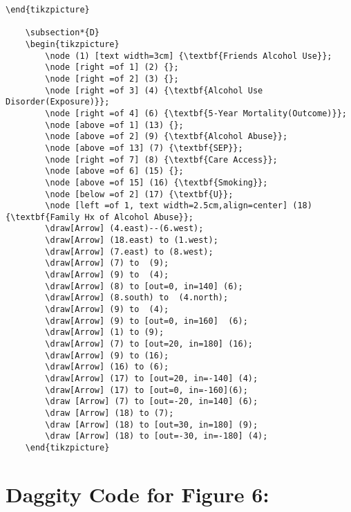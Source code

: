 \documentclass{article}
\begin{document}
\begin{lstlisting}[frame=single, basicstyle=\ttfamily]
    \end{tikzpicture}
    
    \subsection*{D}
    \begin{tikzpicture}
        \node (1) [text width=3cm] {\textbf{Friends Alcohol Use}};
        \node [right =of 1] (2) {};
        \node [right =of 2] (3) {};
        \node [right =of 3] (4) {\textbf{Alcohol Use Disorder(Exposure)}};
        \node [right =of 4] (6) {\textbf{5-Year Mortality(Outcome)}};
        \node [above =of 1] (13) {};
        \node [above =of 2] (9) {\textbf{Alcohol Abuse}};
        \node [above =of 13] (7) {\textbf{SEP}};
        \node [right =of 7] (8) {\textbf{Care Access}};
        \node [above =of 6] (15) {};
        \node [above =of 15] (16) {\textbf{Smoking}};
        \node [below =of 2] (17) {\textbf{U}};
        \node [left =of 1, text width=2.5cm,align=center] (18) {\textbf{Family Hx of Alcohol Abuse}};
        \draw[Arrow] (4.east)--(6.west);
        \draw[Arrow] (18.east) to (1.west);
        \draw[Arrow] (7.east) to (8.west);
        \draw[Arrow] (7) to  (9);
        \draw[Arrow] (9) to  (4);
        \draw[Arrow] (8) to [out=0, in=140] (6);
        \draw[Arrow] (8.south) to  (4.north);
        \draw[Arrow] (9) to  (4);
        \draw[Arrow] (9) to [out=0, in=160]  (6);
        \draw[Arrow] (1) to (9);
        \draw[Arrow] (7) to [out=20, in=180] (16);
        \draw[Arrow] (9) to (16);
        \draw[Arrow] (16) to (6);
        \draw[Arrow] (17) to [out=20, in=-140] (4);
        \draw[Arrow] (17) to [out=0, in=-160](6);
        \draw [Arrow] (7) to [out=-20, in=140] (6);
        \draw [Arrow] (18) to (7);
        \draw [Arrow] (18) to [out=30, in=180] (9);
        \draw [Arrow] (18) to [out=-30, in=-180] (4);
    \end{tikzpicture}
\end{lstlisting}

\section*{Daggity Code for Figure 6:}
\begin{lstlisting}[frame=single, basicstyle=\ttfamily]

\end{lstlisting}



    
\end{document}
